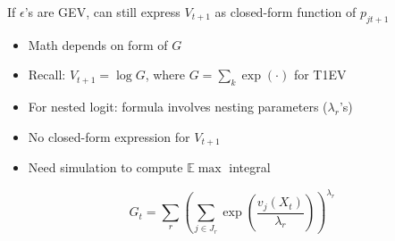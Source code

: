 \documentclass[aspectratio=169]{beamer}
\begin{document}
\begin{frame}

If $\epsilon$'s are GEV, can still express $V_{t+1}$ as closed-form function of $p_{jt+1}$

\bigskip


\begin{itemize}
\itemsep1.5em
\item<3-> Math depends on form of $G$
\item<4-> Recall: $V_{t+1} = \log G$, where $G = \sum_k \exp(\cdot)$ for T1EV
\item<5-> For nested logit: formula involves nesting parameters ($\lambda_r$'s)
\end{itemize}

\bigskip

\begin{itemize}
\itemsep1.5em
\item<7-> No closed-form expression for $V_{t+1}$
\item<8-> Need simulation to compute $\mathbb{E}\max$ integral
\end{itemize}

\end{frame}





\begin{frame}

\begin{displaymath}
G_t=\sum_r\left(\sum_{j\in J_r}\exp\left(\frac{v_j(X_{t})}{\lambda_r}\right)\right)^{\lambda_r}
\end{displaymath}



\end{frame}
\end{document}
